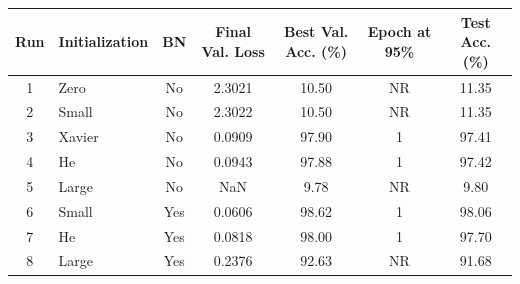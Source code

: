\begin{tabular}{clccccc}
\toprule
Run & Initialization & BN & Final Val. Loss & Best Val. Acc. (\%) & Epoch at 95\% & Test Acc. (\%) \\
\midrule
1 & Zero & No & 2.3021 & 10.50 & NR & 11.35 \\
2 & Small & No & 2.3022 & 10.50 & NR & 11.35 \\
3 & Xavier & No & 0.0909 & 97.90 & 1 & 97.41 \\
4 & He & No & 0.0943 & 97.88 & 1 & 97.42 \\
5 & Large & No & NaN & 9.78 & NR & 9.80 \\
6 & Small & Yes & 0.0606 & 98.62 & 1 & 98.06 \\
7 & He & Yes & 0.0818 & 98.00 & 1 & 97.70 \\
8 & Large & Yes & 0.2376 & 92.63 & NR & 91.68 \\
\bottomrule
\end{tabular}
